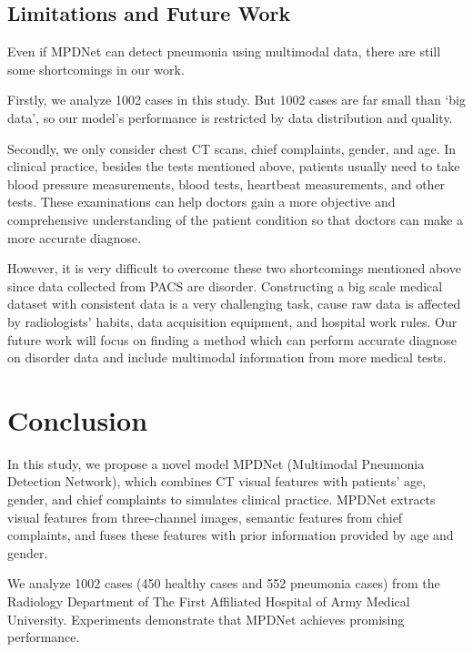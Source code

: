 \documentclass[journal]{IEEEtran}
\begin{document}
\subsection{Limitations and Future Work}
Even if MPDNet can detect pneumonia using multimodal data, there are still some shortcomings in our work.

Firstly, we analyze 1002 cases in this study. But 1002 cases are far small than `big data', so our model's performance is restricted by data distribution and quality. 

Secondly, we only consider chest CT scans, chief complaints, gender, and age. In clinical practice, besides the tests mentioned above, patients usually need to take blood pressure measurements, blood tests, heartbeat measurements, and other tests. These examinations can help doctors gain a more objective and comprehensive understanding of the patient condition so that doctors can make a more accurate diagnose.

However, it is very difficult to overcome these two shortcomings mentioned above since data collected from PACS are disorder. Constructing a big scale medical dataset with consistent data is a very challenging task, cause raw data is affected by radiologists' habits, data acquisition equipment, and hospital work rules. 
Our future work will focus on finding a method which can perform accurate diagnose on disorder data and include multimodal information from more medical tests.

\section{Conclusion}
\label{conclude}
In this study, we propose a novel model MPDNet (Multimodal Pneumonia Detection Network), which combines CT visual features with patients' age, gender, and chief complaints to simulates clinical practice. 
MPDNet extracts visual features from three-channel images, semantic features from chief complaints, and fuses these features with prior information provided by age and gender.

We analyze 1002 cases (450 healthy cases and 552 pneumonia cases) from the Radiology Department of The First Affiliated Hospital of Army Medical University. Experiments demonstrate that MPDNet achieves promising performance.
\end{document}
